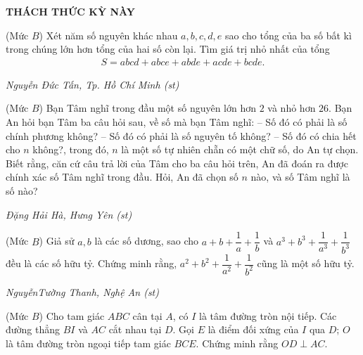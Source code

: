 \begin{center}
	\vspace*{-5pt}
	\textbf{\color{thachthuctoanhoc}THÁCH THỨC KỲ NÀY}
	\vspace*{-5pt}
\end{center}
\begin{multicols}{2}
	\setlength{\abovedisplayskip}{4pt}
	\setlength{\belowdisplayskip}{4pt}
	{}
	(Mức $B$) Xét năm số nguyên khác nhau $a,b,c,d,e$ sao cho tổng của ba số bất kì trong chúng lớn hơn tổng của hai số còn lại. Tìm giá trị nhỏ nhất của tổng 
	\begin{align*}
		S=abcd+abce+abde+acde+bcde.
	\end{align*}
	\begin{flushright}
		\textit{Nguyễn Đức Tấn, Tp. Hồ Chí Minh (st)}
	\end{flushright}
	{}
	(Mức $B$) Bạn Tâm nghĩ trong đầu một số nguyên lớn hơn $2$ và nhỏ hơn $26$. Bạn An hỏi bạn Tâm ba câu hỏi sau, về số mà bạn Tâm nghĩ:  
	\vskip 0.05cm
	-- Số đó có phải là số chính phương không?
	\vskip 0.05cm
	-- Số đó có phải là số nguyên tố không?
	\vskip 0.05cm
	-- Số đó có chia hết cho $n$ không?, 
	\vskip 0.05cm
	trong đó, $n$ là một số tự nhiên chẵn có một chữ số, do An tự chọn. 
	\vskip 0.05cm
	Biết rằng, căn cứ câu trả lời của Tâm cho ba câu hỏi trên, An đã đoán ra được chính xác số Tâm nghĩ trong đầu. Hỏi, An đã chọn số $n$ nào, và số Tâm nghĩ là số nào?
	\begin{flushright}
		\textit{Đặng Hải Hà, Hưng Yên (st)}
	\end{flushright}
	{}
	(Mức $B$) Giả sử $a,b$ là các số dương, sao cho $a+b+\dfrac1a+\dfrac1b$ và $a^3+b^3+\dfrac1{a^3}+\dfrac1{b^3}$ đều là các số hữu tỷ. Chứng minh rằng, $a^2+b^2+\dfrac1{a^2}+\dfrac1{b^2}$ cũng là một số hữu tỷ. 
	\begin{flushright}
		\textit{NguyễnTường Thanh, Nghệ An (st)}
	\end{flushright}
	{}
	(Mức $B$) Cho tam giác $ABC$ cân tại $A$, có $I$ là tâm đường tròn nội tiếp. Các đường thẳng $BI$ và $AC$ cắt nhau tại $D$. Gọi $E$ là điểm đối xứng của $I$ qua $D$; $O$ là tâm đường tròn ngoại tiếp tam giác $BCE$. Chứng minh rằng $OD\perp AC$. 
		\begin{figure}[H]
		\centering
		\vspace*{-5pt}
		\captionsetup{labelformat= empty, justification=centering}

\end{figure}
\end{multicols}
